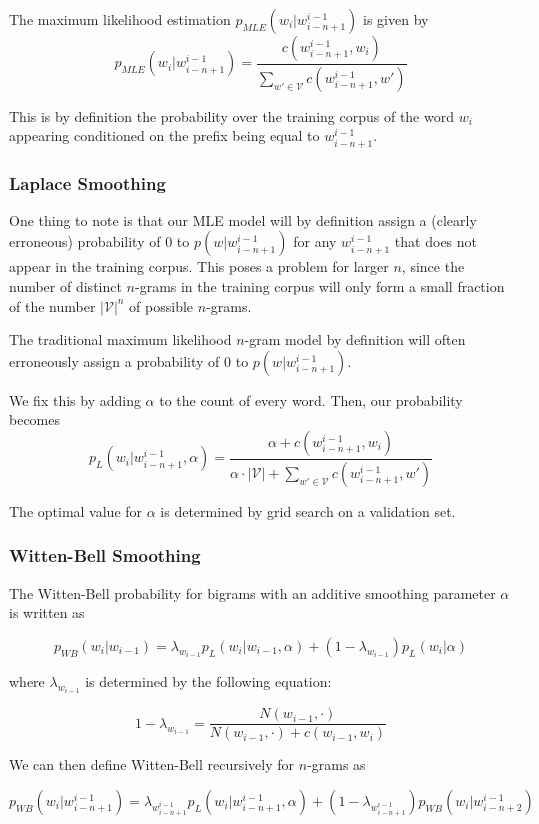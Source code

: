 \documentclass[11pt]{article}
\begin{document}
The maximum likelihood estimation $p_{MLE}(w_i|w^{i-1}_{i-n+1})$ is given by 
$$p_{MLE}(w_i|w^{i-1}_{i-n+1}) = \frac{c(w^{i-1}_{i-n+1}, w_i)}{\sum_{w' \in \mathcal{V}} c(w^{i-1}_{i-n+1}, w')}$$

This is by definition the probability over the training corpus of the word $w_i$ appearing conditioned on the prefix being equal to $w^{i-1}_{i-n+1}$. 

\subsubsection{Laplace Smoothing}

 One thing to note is that our MLE model will by definition assign a (clearly erroneous) probability of $0$ to $p(w|w^{i-1}_{i-n+1})$ for any $w^{i-1}_{i-n+1}$ that does not appear in the training corpus. This poses a problem for larger $n$, since the number of distinct $n$-grams in the training corpus will only form a small fraction of the number $|\mathcal{V}|^n$ of possible $n$-grams.

The traditional maximum likelihood $n$-gram model by definition will often erroneously assign a probability of $0$ to $p(w|w^{i-1}_{i-n+1})$. 

We fix this by adding $\alpha$ to the count of every word. Then, our probability becomes 
$$p_L(w_i|w^{i-1}_{i-n+1}, \alpha) = \frac{\alpha + c(w^{i-1}_{i-n+1}, w_i)}{\alpha \cdot |\mathcal{V}| + \sum_{w' \in \mathcal{V}} c(w^{i-1}_{i-n+1}, w')}$$

The optimal value for $\alpha$ is determined by grid search on a validation set. 

\subsubsection{Witten-Bell Smoothing}

The Witten-Bell probability for bigrams with an additive smoothing parameter $\alpha$ is written as

$$p_{WB}(w_i|w_{i-1}) = \lambda_{w_{i-1}} p_L(w_i|w_{i-1}, \alpha) + (1-\lambda_{w_{i-1}}) p_L(w_i| \alpha)$$

where $\lambda_{w_{i-1}}$ is determined by the following equation:

$$1 - \lambda_{w_{i-1}} = \frac{N(w_{i-1}, \cdot)}{N(w_{i-1}, \cdot) + c(w_{i-1}, w_i)}$$

We can then define Witten-Bell recursively for $n$-grams as

$$p_{WB}(w_i|w^{i-1}_{i-n+1}) = \lambda_{w^{i-1}_{i-n+1}} p_L(w_i|w^{i-1}_{i-n+1}, \alpha) + (1-\lambda_{w^{i-1}_{i-n+1}}) p_{WB}(w_i|w^{i-1}_{i-n+2})$$
\end{document}
